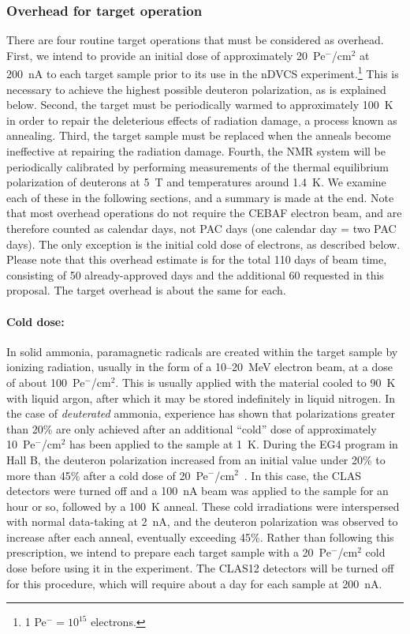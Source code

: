 \subsubsection{Overhead for target operation}\label{sec_target_over}
There are four routine target operations that must be considered as overhead. 
First, we intend to provide an initial dose of approximately 20~Pe$^{\minus}$/cm$^2$ at 200~nA to each target sample prior to its use in the nDVCS experiment.\footnote{1 Pe$^{\minus} = 10^{15}$ electrons.}  This is necessary to achieve the highest possible deuteron polarization, as is explained below.  Second, the target must be periodically warmed to approximately 100~K in order to repair the deleterious effects of radiation damage, a process known as annealing.  Third, the target sample must be replaced when the anneals become ineffective at repairing the radiation damage.  Fourth, the NMR system will be periodically calibrated by performing
measurements of the thermal equilibrium polarization of deuterons at 5~T and temperatures around 1.4~K.
We examine each of these in the following sections, and a summary is made at the end.
Note that most overhead operations do not require the CEBAF electron beam, and are 
therefore counted as calendar days, not PAC days (one calendar day = two PAC days).
The only exception is the initial cold dose of electrons, as described below. Please note that this overhead estimate is for the total 110 days of beam time, consisting of 50 already-approved days and the additional 60 requested in this proposal. The target overhead is about the same for each. 

\vspace{-.15in}
\paragraph{Cold dose:}
In solid ammonia, paramagnetic radicals are created within the target sample by ionizing radiation, usually 
in the form of a 10--20~MeV electron beam, at a dose of about 
100~Pe$^{\minus}$/cm$^2$.
This is usually applied with the material cooled to 90~K with liquid argon, after which it may be stored indefinitely in liquid nitrogen.  
In the case of {\em deuterated\/} ammonia, experience has shown that polarizations greater than 20\% are only achieved after an additional  ``cold'' dose of approximately 10~Pe$^{\minus}$/cm$^2$ 
has been applied to the sample at 1~K.  
During the EG4 program in Hall B, the deuteron polarization increased from an initial value under 20\% to more than 45\%  after a cold dose of  20~Pe$^{\minus}$/cm$^2$~\cite{Slifer2007}.  In this case, the CLAS detectors were turned off and a 100~nA beam was applied to the sample for an hour or so, followed by a 100~K anneal.  These cold irradiations were interspersed with normal data-taking at 2~nA, and the deuteron polarization was observed to increase after each anneal, eventually exceeding 45\%.  Rather than following this prescription, we intend to prepare each target sample with a 20~Pe$^{\minus}$/cm$^2$ cold dose before using it in the experiment.  The CLAS12 detectors will be turned off for this procedure, which will require about a day for each sample at 200~nA. 

